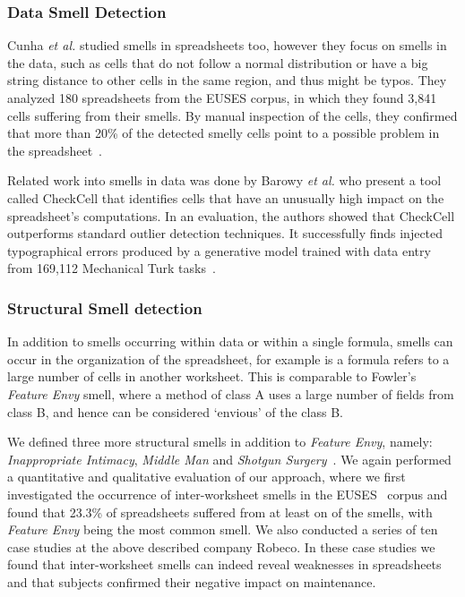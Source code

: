 \documentclass[conference]{IEEEtran}
\begin{document}
\subsubsection{Data Smell Detection}
Cunha \emph{et al.} studied smells in spreadsheets too, however they focus on smells in the data, such as cells that do not follow a normal distribution or have a big string distance to other cells in the same region, and thus might be typos. They analyzed 180 spreadsheets from the EUSES corpus, in which they found 3,841 cells suffering from their smells. By manual inspection of the cells, they confirmed that more than 20\% of the detected smelly cells point to a possible problem in the spreadsheet~\cite{cunha_towards_2012}.

Related work into smells in data was done by Barowy \emph{et al.} who present a tool called CheckCell that identifies cells that have an unusually high impact on the spreadsheet's computations. In an evaluation, the authors showed that CheckCell outperforms standard outlier detection techniques. It successfully finds injected typographical errors produced by a generative model trained with data entry from 169,112 Mechanical Turk tasks~\cite{barowy_checkcell:_2014}.


\subsubsection{Structural Smell detection}
In addition to smells occurring within data or within a single formula, smells can occur in the organization of the spreadsheet, for example is a formula refers to a large number of cells in another worksheet. This is comparable to Fowler's \emph{Feature Envy} smell, where a method of class A uses a large number of fields from class B, and hence can be considered `envious' of the class B.

We defined three more structural smells in addition to \emph{Feature Envy}, namely: \emph{Inappropriate Intimacy}, \emph{Middle Man} and \emph{Shotgun Surgery}~\cite{hermans_detecting_2012-1}. We again performed a quantitative and qualitative evaluation of our approach, where we first investigated the occurrence of inter-worksheet smells in the EUSES~\cite{fisher_euses_2005} corpus and found that 23.3\% of spreadsheets suffered from at least on of the smells, with \emph{Feature Envy} being the most common smell. We also conducted a series of ten case studies at the above described company Robeco. In these case studies we found that inter-worksheet smells can indeed reveal weaknesses in spreadsheets and that subjects confirmed their negative impact on maintenance.
\end{document}
